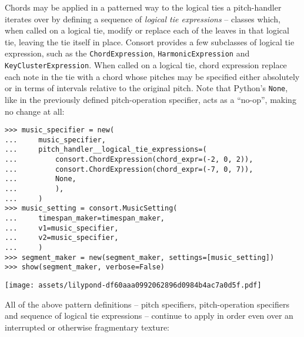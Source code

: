 \noindent Chords may be applied in a patterned way to the logical ties a
pitch-handler iterates over by defining a sequence of \emph{logical tie
expressions} -- classes which, when called on a logical tie, modify or replace
each of the leaves in that logical tie, leaving the tie itself in place.
Consort provides a few subclasses of logical tie expression, such as the
\texttt{ChordExpression}, \texttt{HarmonicExpression} and
\texttt{KeyClusterExpression}. When called on a logical tie, chord expression
replace each note in the tie with a chord whose pitches may be specified either
absolutely or in terms of intervals relative to the original pitch. Note that
Python's \texttt{None}, like in the previously defined pitch-operation
specifier, acts as a \enquote{no-op}, making no change at all:

\begin{comment}
<abjad>[stylesheet=../consort.ily]
music_specifier = new(
    music_specifier,
    pitch_handler__logical_tie_expressions=(
        consort.ChordExpression(chord_expr=(-2, 0, 2)),
        consort.ChordExpression(chord_expr=(-7, 0, 7)),
        None,
        ),
    )
music_setting = consort.MusicSetting(
    timespan_maker=timespan_maker,
    v1=music_specifier,
    v2=music_specifier,
    )
segment_maker = new(segment_maker, settings=[music_setting])
show(segment_maker, verbose=False)
</abjad>
\end{comment}

\begin{abjadbookoutput}
\begin{singlespacing}
\vspace{-0.5\baselineskip}
\begin{verbatim}
>>> music_specifier = new(
...     music_specifier,
...     pitch_handler__logical_tie_expressions=(
...         consort.ChordExpression(chord_expr=(-2, 0, 2)),
...         consort.ChordExpression(chord_expr=(-7, 0, 7)),
...         None,
...         ),
...     )
>>> music_setting = consort.MusicSetting(
...     timespan_maker=timespan_maker,
...     v1=music_specifier,
...     v2=music_specifier,
...     )
>>> segment_maker = new(segment_maker, settings=[music_setting])
>>> show(segment_maker, verbose=False)
\end{verbatim}
\noindent\texttt{[image: assets/lilypond-df60aaa0992062896d0984b4ac7a0d5f.pdf]}
\end{singlespacing}
\end{abjadbookoutput}

\noindent All of the above pattern definitions -- pitch specifiers,
pitch-operation specifiers and sequence of logical tie expressions -- continue
to apply in order even over an interrupted or otherwise fragmentary texture:

